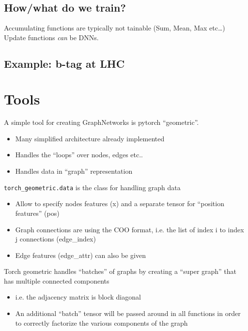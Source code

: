 \subsection{How/what do we train?}

Accumulating functions are typically not tainable (Sum, Mean, Max etc…)\\
Update functions \textit{can} be DNNs.


\subsection{Example: b-tag at LHC}

\section{Tools}

A simple tool for creating GraphNetworks is pytorch “geometric”.
\begin{itemize}
	\item Many simplified architecture already implemented
	\item Handles the “loops” over nodes, edges etc..
	\item Handles data in “graph” representation
\end{itemize}

\texttt{torch\_geometric.data} is the class for handling
graph data

\begin{itemize}
	\item Allow to specify nodes features (x) and a separate tensor for “position features” (pos)
	\item Graph connections are using the COO format, i.e. the list of index i to index j connections (edge\_index)
	\item Edge features (edge\_attr) can also be given
\end{itemize}

Torch geometric handles “batches” of graphs
by creating a “super graph” that has multiple
connected components
\begin{itemize}
	\item i.e. the adjacency matrix is block diagonal
	\item An additional “batch” tensor will be passed around in
	all functions in order to correctly factorize the various components of the graph
\end{itemize}

